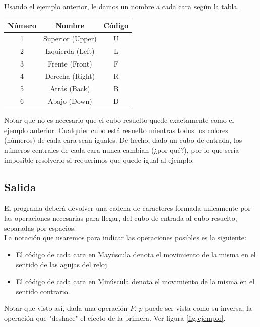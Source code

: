 \documentclass[11pt,a4paper]{article}
\begin{document}
Usando el ejemplo anterior, le damos un nombre a cada cara según la tabla. \\

\begin{center}
\begin{tabular}{| c || c | c |}
\hline 
Número & Nombre & Código \\ \hline
1 & Superior (Upper) & U \\ \hline
2 & Izquierda (Left) & L \\ \hline
3 & Frente (Front) & F \\ \hline
4 & Derecha (Right) & R \\ \hline
5 & Atrás (Back) & B \\ \hline
6 & Abajo (Down) & D \\ \hline
\end{tabular}
\end{center}


Notar que no es necesario que el cubo resuelto quede exactamente como el ejemplo anterior. Cualquier cubo está resuelto mientras todos los colores (números) de cada cara sean iguales. 
De hecho, dado un cubo de entrada, los números centrales de cada cara nunca cambian (¿por qué?), por lo que sería imposible resolverlo si requerimos que quede igual al ejemplo. %

\subsection{Salida}
El programa deberá devolver una cadena de caracteres formada unicamente por las operaciones necesarias para llegar, del cubo de entrada al cubo resuelto, separadas por espacios.\\
La notación que usaremos para indicar las operaciones posibles es la siguiente:
\begin{itemize}
\item El código de cada cara en Mayúscula denota el movimiento de la misma en el sentido de las agujas del reloj.
\item El código de cada cara en Minúscula denota el movimiento de la misma en el sentido contrario. 
\end{itemize}

Notar que visto así, dada una operación $P$, $p$ puede ser vista como su inversa, la operación que "deshace" el efecto de la primera. Ver figura \ref{fig:ejemplo}. \\
\end{document}
